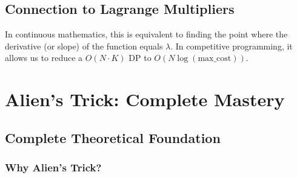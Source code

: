 \documentclass[11pt,a4paper,oneside]{book}
\begin{document}
\subsection{Connection to Lagrange Multipliers}
In continuous mathematics, this is equivalent to finding the point where the derivative (or slope) of the function equals $\lambda$. In competitive programming, it allows us to reduce a $O(N \cdot K)$ DP to $O(N \log (\text{max\_cost}))$.

\section{Alien's Trick: Complete Mastery}

\subsection{Complete Theoretical Foundation}

\subsubsection{Why Alien's Trick?}
\end{document}
